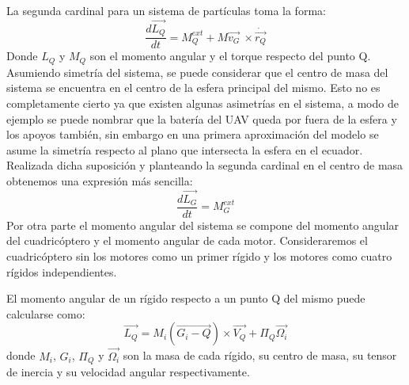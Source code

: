 \documentclass[main]{subfiles}
\begin{document}
La segunda cardinal para un sistema de part\'iculas toma la forma:
\begin{equation}
\frac{d\vec{L_Q}}{dt} =M_Q^{ext}+M\vec{v_G}\ \times \dot{\vec{r_Q}} 
\end{equation}
Donde $L_Q$ y $M_Q$ son el momento angular y el torque respecto del punto Q.
Asumiendo simetr\'ia del sistema, se puede considerar que el centro de masa del sistema se encuentra en el centro de la esfera principal del mismo. Esto no es completamente cierto ya que existen algunas asimetr\'ias en el sistema, a modo de ejemplo se puede nombrar que la bater\'ia del UAV queda por fuera de la esfera y los apoyos tambi\'en, sin embargo en una primera aproximaci\'on del modelo se asume la simetr\'ia respecto al plano que intersecta la esfera en el ecuador. Realizada dicha suposici\'on y planteando la segunda cardinal en el centro de masa obtenemos una expresi\'on m\'as sencilla:
\begin{equation}
\frac{d\vec{L_G}}{dt} =M_G^{ext}
\end{equation}
Por otra parte el momento angular del sistema se compone del momento angular del cuadric\'optero y el momento angular de cada motor. Consideraremos el cuadric\'optero sin los motores como un primer r\'igido y los motores como cuatro r\'igidos independientes.

El momento angular de un r\'igido respecto a un punto Q del mismo puede calcularse como:
\begin{equation}
\vec{L_Q} = M_i(\vec{G_i-Q})\times\vec{V_Q}+\Pi_{Q}\vec{\Omega_i}
\end{equation}
donde $M_i$, $G_i$, $\Pi_{Q}$ y $\vec{\Omega_i}$ son la masa de cada r\'igido, su centro de masa, su tensor de inercia y su velocidad angular respectivamente.\\
\end{document}
